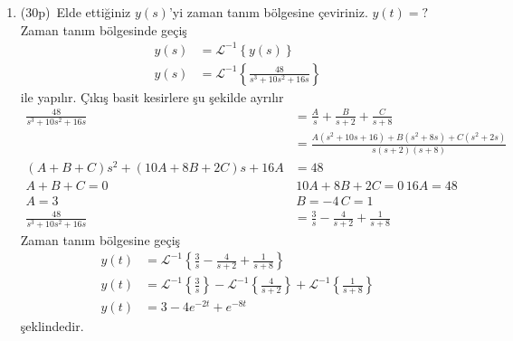 \begin{enumerate}
    \item(30p)\, Elde ettiğiniz $y(s)$'yi zaman tanım bölgesine çeviriniz. $y(t)=?$
    Zaman tanım bölgesinde geçiş
    \begin{equation}
        \begin{split}
            y(s)&=\mathcal{L}^{-1}\left\{y(s)\right\}\\
            y(s)&=\mathcal{L}^{-1}\left\{\frac{48}{s^3+10s^2+16s}\right\}
        \end{split}
    \end{equation}
    ile yapılır. Çıkış basit kesirlere şu şekilde ayrılır
    \begin{equation}
        \begin{split}
            \frac{48}{s^3+10s^2+16s}&=\frac{A}{s}+\frac{B}{s+2}+\frac{C}{s+8}\\
            &=\frac{A(s^2+10s+16)+B(s^2+8s)+C(s^2+2s)}{s(s+2)(s+8)}\\
            (A+B+C)s^2+(10A+8B+2C)s+16A&=48\\
            A+B+C=0\,&\,10A+8B+2C=0\,16A=48\\
            A=3\,&\,B=-4\,C=1\\
            \frac{48}{s^3+10s^2+16s}&=\frac{3}{s}-\frac{4}{s+2}+\frac{1}{s+8}
        \end{split}
    \end{equation}
    Zaman tanım bölgesine geçiş
    \begin{equation}
        \begin{split}
            y(t)&=\mathcal{L}^{-1}\left\{\frac{3}{s}-\frac{4}{s+2}+\frac{1}{s+8}\right\}\\
            y(t)&=\mathcal{L}^{-1}\left\{\frac{3}{s}\right\}-\mathcal{L}^{-1}\left\{\frac{4}{s+2}\right\}+\mathcal{L}^{-1}\left\{\frac{1}{s+8}\right\}\\
            y(t)&=3-4e^{-2t}+e^{-8t}
        \end{split}
    \end{equation}
    şeklindedir.
\end{enumerate}